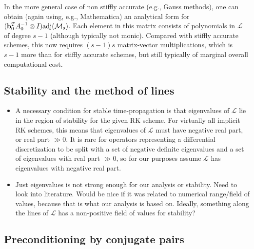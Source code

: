\documentclass[review]{siamart}
\begin{document}
In the more general case of non stiffly accurate (e.g., Gauss methods), one can
obtain (again using, e.g., Mathematica) an analytical form for
$(\mathbf{b}_0^TA_0^{-1}\otimes I)\textnormal{adj}(\mathcal{M}_s)$. Each element in
this matrix consists of polynomials in $\mathcal{L}$ of degree $s-1$ (although
typically not monic). Compared with stiffly accurate schemes, this now requires 
$(s-1)s$ matrix-vector multiplications, which is $s-1$ more than for stiffly
accurate schemes, but still typically of marginal overall computational cost. 

\subsection{Stability and the method of lines}

{\color{blue}
\begin{itemize}

\item A necessary condition for stable time-propagation is that eigenvalues of $\mathcal{L}$
lie in the region of stability for the given RK scheme. For virtually all implicit RK schemes,
this means that eigenvalues of $\mathcal{L}$ must have negative real part, or real part
$\gg 0$. It is rare for operators representing a differential discretization to be split
with a set of negative definite eigenvalues and a set of eigenvalues with real part $\gg 0$,
so for our purposes assume $\mathcal{L}$ has eigenvalues with negative real part.

\item Just eigenvalues is not strong enough for our analysis or stability. Need to look
into literature. Would be nice if it was related to numerical range/field of values, because
that is what our analysis is based on. Ideally, something along the lines of $\mathcal{L}$ 
has a non-positive field of values for stability? 
\end{itemize}
}


\subsection{Preconditioning by conjugate pairs}
\end{document}
